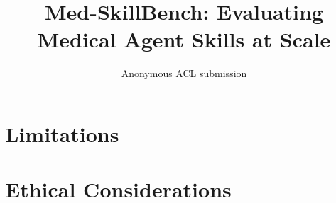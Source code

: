 \documentclass[11pt]{article}
\title{Med-SkillBench: Evaluating Medical Agent Skills at Scale}
\author{Anonymous ACL submission}
\theoremstyle{plain}
\theoremstyle{definition}
\begin{document}
\linenumbers
\maketitle








\section*{Limitations}


\section*{Ethical Considerations}




\clearpage
\appendix

\end{document}
